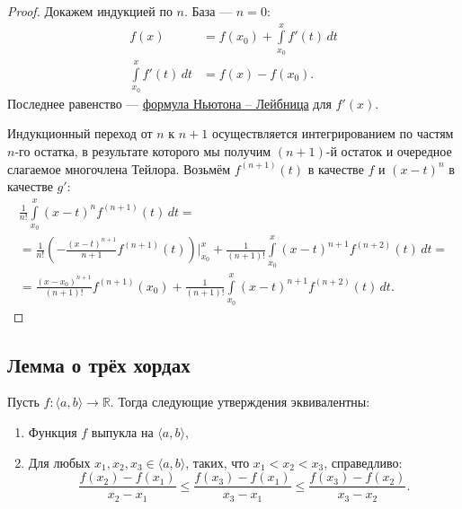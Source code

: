 \begin{proof}
	Докажем индукцией по \(n\). База ---  \(n = 0\):
	\begin{align*}
		f(x) &= f(x_0) + \int\limits_{x_0}^x f'(t) \, dt \\
		\int\limits_{x_0}^x f'(t) \, dt &= f(x) - f(x_0).
	\end{align*}
	Последнее равенство --- \hyperlink{t9}{формула Ньютона -- Лейбница} для \(f'(x)\).
	
	Индукционный переход от \(n\) к \(n + 1\) осуществляется интегрированием по частям \(n\)-го остатка, в результате которого мы получим \((n + 1)\)-й остаток и очередное слагаемое многочлена Тейлора. Возьмём \(f^{(n + 1)}(t)\) в качестве \(f\) и \((x - t)^n\)
	в качестве \(g'\):
	\begin{multline*}
		\frac{1}{n!} \int\limits_{x_0}^x (x - t)^n f^{(n + 1)}(t) \, dt = \\
		= \frac{1}{n!} \left(-\frac{(x - t)^{n + 1}}{n + 1} f^{(n + 1)}(t)\right) \bigg|_{x_0}^x + \frac{1}{(n + 1)!} \int\limits_{x_0}^x (x - t)^{n + 1} f^{(n + 2)}(t) \, dt = \\
		= \frac{(x - x_0)^{n + 1}}{(n + 1)!} f^{(n + 1)}(x_0)
		+ \frac{1}{(n + 1)!} \int\limits_{x_0}^x (x - t)^{n + 1} f^{(n + 2)}(t) \, dt.
	\end{multline*}
\end{proof}

\subsection{Лемма о трёх хордах}

\hypertarget{trihordy}{}
\begin{theorem}
	Пусть \(f \colon \langle a, b \rangle \to \mathbb{R}\). Тогда следующие утверждения эквивалентны:
	\begin{enumerate}
		\item Функция \(f\) выпукла на \(\langle a, b \rangle\),
		\item Для любых \(x_1, x_2, x_3 \in \langle a, b \rangle\), таких, что \(x_1 < x_2 < x_3\), справедливо: \[
		\frac{f(x_2) - f(x_1)}{x_2 - x_1} \leqslant \frac{f(x_3) - f(x_1)}{x_3 - x_1} \leqslant \frac{f(x_3) - f(x_2)}{x_3 - x_2}.
		\]
	\end{enumerate}
\end{theorem}

